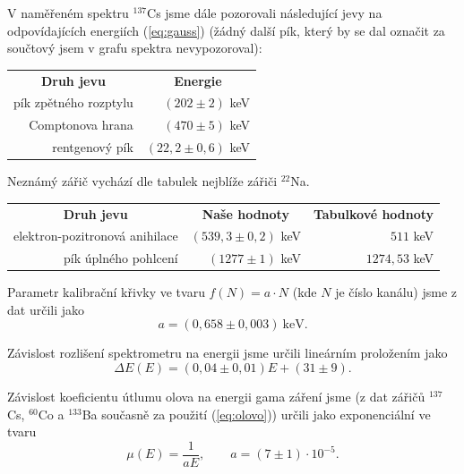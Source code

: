 \documentclass[english]{article}
\newcommand{\unit}[1]{\mathrm{#1}}
\begin{document}
					V naměřeném spektru $^{137}$Cs jsme dále pozorovali následující jevy na odpovídajících energiích (\ref{eq:gauss})  (žádný další pík, který by se dal označit za součtový jsem v grafu spektra nevypozoroval):
					\begin{center}
					\begin{tabular}{rr}
							\multicolumn{1}{c}{\textbf{Druh jevu} } & \multicolumn{1}{c}{\textbf{Energie} }\\
							pík zpětného rozptylu & $(202 \pm 2)$ keV \\
							Comptonova hrana & $(470 \pm 5)$ keV \\
							rentgenový pík & $(22,2 \pm 0,6)$ keV \\
					\end{tabular}
					\end{center}
					\vspace{0.4cm}
					
					Neznámý zářič vychází dle tabulek nejblíže zářiči $^{22}$Na. 
					\begin{center}
					\begin{tabular}{rrr}
							\multicolumn{1}{c}{\textbf{Druh jevu} } & \multicolumn{1}{c}{\textbf{Naše hodnoty}} & \multicolumn{1}{c}{\textbf{Tabulkové hodnoty \cite{bib:net}}}\\
					        elektron-pozitronová anihilace &  $(539,3 \pm 0,2)$ keV & $511$ keV\\
					        pík úplného pohlcení & $(1277 \pm 1)$ keV & $1274,53$ keV\\
					\end{tabular}					
					\end{center}
					
					Parametr kalibrační křivky ve tvaru $f(N)=a\cdot N$ (kde $N$ je číslo kanálu) jsme z dat určili jako 
					\begin{equation}
							a = (0,658 \pm 0,003)\ \unit{keV}.
					\end{equation}
					
					Závislost rozlišení spektrometru na energii jsme určili lineárním proložením jako 
					\begin{equation}
							\Delta E(E) = (0,04 \pm 0,01)  E + (31 \pm 9).
					\end{equation}
					
					Závislost koeficientu útlumu olova na energii gama záření jsme (z dat zářičů $^{137}$Cs, $^{60}$Co a $^{133}$Ba současně za použití (\ref{eq:olovo})) určili jako exponenciální ve tvaru
					\begin{equation}
							\mu(E) = \frac{1}{aE}, \qquad a=(7 \pm 1) \cdot 10^{-5}.
					\end{equation}
							
\end{document}
